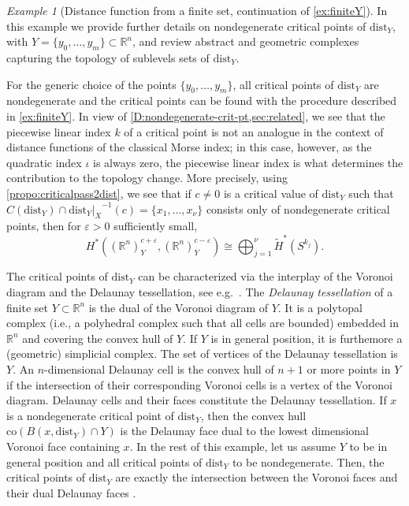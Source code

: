 \documentclass{amsart}
\newcommand{\R}{\mathbb{R}}
\newcommand{\dd}{\mathrm{dist}}
\newcommand{\dist}{{\mathrm{dist}_Y|_X}}
\def\lini{k}
\def\quadi{\iota}
\theoremstyle{definition}
\theoremstyle{remark}
\newtheorem{example}[subsubsection]{Example}
\begin{document}
\begin{example}[Distance function from a finite set, continuation of \cref{ex:finiteY}]\label{example:points2}
In this example we provide further details on nondegenerate critical points of $\dd_Y$, with $Y=\{y_0,\ldots ,y_m\}\subset \mathbb{R}^n$, and review abstract and geometric complexes capturing the topology of sublevels sets of $\dd_Y$.

For the generic choice of the points $\{y_0, \ldots, y_m\}$, all critical points of $\dd_Y$ are nondegenerate and the critical points can be found with the procedure described in \cref{ex:finiteY}. 
In view of \cref{D:nondegenerate-crit-pt,sec:related}, we see that the piecewise linear index $\lini$ of a critical point is not an analogue in the context of distance functions of the classical Morse index; in this case, however, as the quadratic index $\quadi$ is always zero, the piecewise linear index is what determines the contribution to the topology change.
More precisely, using \cref{propo:criticalpass2dist}, we see that if $c\neq 0$ is a critical value of $\dd_Y$ such that 
$C(\dd_Y)\cap \dist^{-1}(c)=\{x_1, \ldots, x_\nu\}$ consists only of nondegenerate critical points, then for $\varepsilon>0$ sufficiently small, 
\[
H^*((\R^n)^{ c+\varepsilon}_Y, (\R^n)^{c-\varepsilon}_Y)\cong \bigoplus_{j=1}^\nu\widetilde{H}^*(S^{\lini_j}).
\]

The critical points of $\dd_Y$ can be characterized via the interplay of the Voronoi diagram and the Delaunay tessellation, see e.g.\ \cite{buchin2008recursive}. 
The \emph{Delaunay tessellation} of a finite set $Y\subset \mathbb{R}^n$ is the dual of the Voronoi diagram of $Y$. It is a polytopal complex (i.e., a polyhedral complex such that all cells are bounded) embedded in $\mathbb{R}^n$ and covering the convex hull of $Y$. If $Y$ is in general position, it is furthemore a (geometric) simplicial complex. The set of vertices of the Delaunay tessellation is $Y$. An $n$-dimensional Delaunay cell is the convex hull of $n+1$ or more points in $Y$ if the intersection of their corresponding Voronoi cells is a vertex of the Voronoi diagram. Delaunay cells and their faces constitute the Delaunay tessellation. If $x$ is a nondegenerate critical point of $\dd_Y$, then the convex hull $\mathrm{co}(B(x,\dd_Y)\cap Y)$ is the Delaunay face dual to the lowest dimensional Voronoi face containing $x$. In the rest of this example, let us assume $Y$ to be in general position and all critical points of $\dd_Y$ to be nondegenerate. Then, the critical points of $\dd_Y$ are exactly the intersection between the Voronoi faces and their dual Delaunay faces \cite{buchin2008recursive}.


\end{example}
\end{document}
